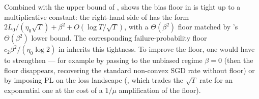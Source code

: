 \begin{remark}\label{rem:lower_bound_implication}
Combined with the upper bound of ,
 shows the bias floor in 
is tight up to a multiplicative constant: the right-hand side of
 has the form
$2 L_0 / (\eta_0 \sqrt T) + \beta^2 + O(\log T / \sqrt T)$, with a
$\Theta(\beta^2)$ floor matched by 's
$\Theta(\beta^2)$ lower bound. The corresponding failure-probability
floor $c_2 \beta^2 / (\eta_0 \log 2)$ in 
inherits this tightness. To improve the floor, one would have to
strengthen  --- for example
by passing to the unbiased regime $\beta = 0$ (then the floor disappears,
recovering the standard non-convex SGD rate without floor) or by
imposing PL on the loss landscape (, which
trades the $\sqrt T$ rate for an exponential one at the cost of a
$1/\mu$ amplification of the floor).
\end{remark}
